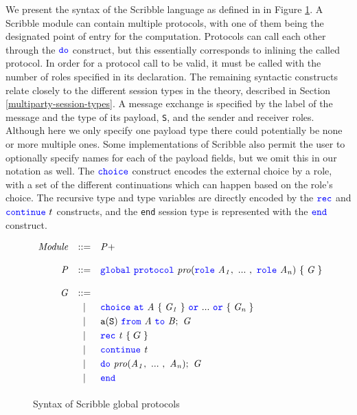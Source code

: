 \documentclass[12pt,twoside]{report}
\newcommand{\white}{\ \ \ \ \ \ \ \ \ \ \ \ }
\begin{document}
We present the syntax of the Scribble language as defined in \cite{featherweight} in Figure \ref{scribble-global-protocol}. A Scribble module can contain multiple protocols, with one of them being the designated point of entry for the computation. Protocols can call each other through the ${\color{blue}\mathtt{do}}$ construct, but this essentially corresponds to inlining the called protocol. In order for a protocol call to be valid, it must be called with the number of roles specified in its declaration. The remaining syntactic constructs relate closely to the different session types in the theory, described in Section \ref{multiparty-session-types}. A message exchange is specified by the label of the message and the type of its payload, \texttt{S}, and the sender and receiver roles. Although here we only specify one payload type there could potentially be none or more multiple ones. Some implementations of Scribble also permit the user to optionally specify names for each of the payload fields, but we omit this in our notation as well. The ${\color{blue}\mathtt{choice}}$ construct encodes the external choice by a role, with a set of the different continuations which can happen based on the role's choice. The recursive type and type variables are directly encoded by the ${\color{blue}\mathtt{rec}}$ and ${\color{blue}\mathtt{continue}}\ t$ constructs, and the \texttt{end} session type is represented with the ${\color{blue}\mathtt{end}}$ construct.\\



\begin{figure}[!h]
    \centering
    \begin{math}
        \begin{array}{rcl}
            \mathit{Module} & ::= & \mathit{P}+\\\\
            \mathit{P} & ::= & {\color{blue}\mathtt{global}}\ {\color{blue}\mathtt{protocol}}\ \mathit{pro}({\color{blue}\mathtt{role}}\ \mathit{A_1},\ ...\ ,\ {\color{blue}\mathtt{role}}\ \mathit{A_n})\ \{\;\mathit{G}\;\} \\\\
            \mathit{G} & ::= &\\[2.75pt]
              &   | & {\color{blue}\mathtt{choice}}\ {\color{blue}\mathtt{at}}\ \mathit{A}\ \{\;\mathit{G_1}\;\}\ {\color{blue}\mathtt{or}}\ ...\ {\color{blue}\mathtt{or}}\ \{\;\mathit{G_n}\;\} \\[2.75pt]
              &   | & \mathtt{a}(\mathtt{S})\ {\color{blue}\mathtt{from}}\ \mathit{A}\ {\color{blue}\mathtt{to}}\ \mathit{B};\ \mathit{G} \\[2.75pt]
              &   | & {\color{blue}\mathtt{rec}}\ \mathit{t}\ \{\;G\;\} \\[2.75pt]
              &   | &  {\color{blue}\mathtt{continue}}\ \mathit{t} \\[2.75pt]
              &   | & {\color{blue}\mathtt{do}}\ \mathit{pro}(\mathit{A_1},\ ...\ ,\ \mathit{A_n});\ \mathit{G} \\[2.75pt]
              &   | & {\color{blue}\mathtt{end}} \\[2.75pt]
        \end{array}
    \end{math}
    \caption{Syntax of Scribble global protocols}
    \label{scribble-global-protocol}
\end{figure}
\end{document}
